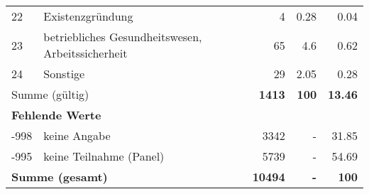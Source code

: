 \begin{longtable}{lXrrr}
        22 & \multicolumn{1}{X}{Existenzgründung} & %
          \num{4} &
          \num[round-mode=places,round-precision=2]{0.28} &
          \num[round-mode=places,round-precision=2]{0.04} \\

        23 & \multicolumn{1}{X}{betriebliches Gesundheitswesen, Arbeitssicherheit} & %
          \num{65} &
          \num[round-mode=places,round-precision=2]{4.6} &
          \num[round-mode=places,round-precision=2]{0.62} \\

        24 & \multicolumn{1}{X}{Sonstige} & %
          \num{29} &
          \num[round-mode=places,round-precision=2]{2.05} &
          \num[round-mode=places,round-precision=2]{0.28} \\

     \midrule
     \multicolumn{2}{l}{Summe (gültig)} &
       \textbf{\num{1413}} &
     \textbf{\num{100}} &
       \textbf{\num[round-mode=places,round-precision=2]{13.46}} \\
     \multicolumn{5}{l}{\textbf{Fehlende Werte}}\\
       -998 &
       keine Angabe &
         \num{3342} &
        - &
         \num[round-mode=places,round-precision=2]{31.85} \\
       -995 &
       keine Teilnahme (Panel) &
         \num{5739} &
        - &
         \num[round-mode=places,round-precision=2]{54.69} \\
     \midrule
     \multicolumn{2}{l}{\textbf{Summe (gesamt)}} &
          \textbf{\num{10494}} &
        \textbf{-} &
        \textbf{\num{100}} \\
     \bottomrule
     \end{longtable}
     
